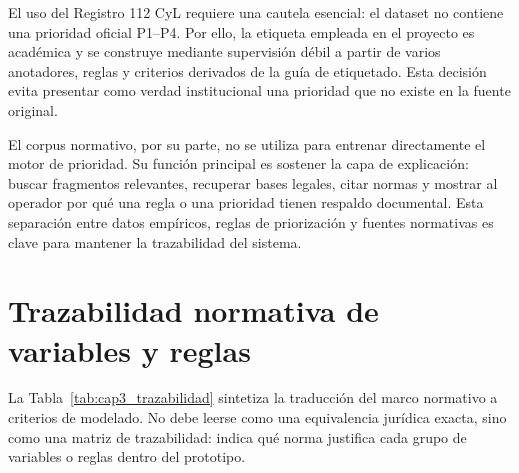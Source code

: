 El uso del Registro 112 CyL requiere una cautela esencial: el dataset no contiene una prioridad oficial P1--P4. Por ello, la etiqueta empleada en el proyecto es académica y se construye mediante supervisión débil a partir de varios anotadores, reglas y criterios derivados de la guía de etiquetado. Esta decisión evita presentar como verdad institucional una prioridad que no existe en la fuente original.

El corpus normativo, por su parte, no se utiliza para entrenar directamente el motor de prioridad. Su función principal es sostener la capa de explicación: buscar fragmentos relevantes, recuperar bases legales, citar normas y mostrar al operador por qué una regla o una prioridad tienen respaldo documental. Esta separación entre datos empíricos, reglas de priorización y fuentes normativas es clave para mantener la trazabilidad del sistema.

\section{Trazabilidad normativa de variables y reglas}

La Tabla~\ref{tab:cap3_trazabilidad} sintetiza la traducción del marco normativo a criterios de modelado. No debe leerse como una equivalencia jurídica exacta, sino como una matriz de trazabilidad: indica qué norma justifica cada grupo de variables o reglas dentro del prototipo.


